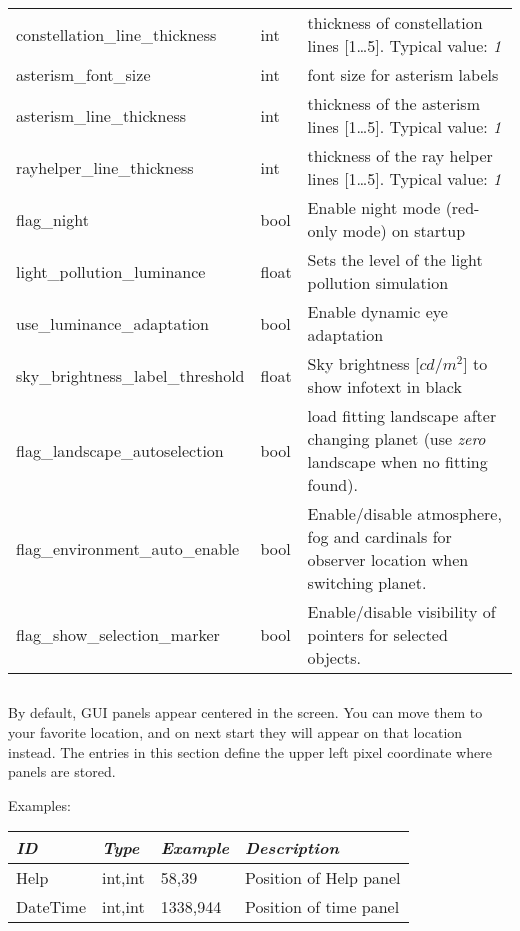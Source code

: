 \begin{longtable}{l|l|p{77mm}}
constellation\_line\_thickness     & int   & thickness of constellation lines [1\ldots5]. Typical value: \emph{1}\\%
asterism\_font\_size               & int   & font size for asterism labels\\%
asterism\_line\_thickness          & int   & thickness of the asterism lines [1\ldots5]. Typical value: \emph{1}\\%
rayhelper\_line\_thickness         & int   & thickness of the ray helper lines [1\ldots5]. Typical value: \emph{1}\\\midrule
flag\_night                        & bool  & Enable night mode (red-only mode) on startup\\\midrule
light\_pollution\_luminance        & float & Sets the level of the light pollution simulation\\\midrule %
use\_luminance\_adaptation         & bool  & Enable dynamic eye adaptation\\\midrule %
sky\_brightness\_label\_threshold  & float & Sky brightness [$cd/m^2$] to show infotext in black \\\midrule  %
flag\_landscape\_autoselection     & bool  & load fitting landscape after changing planet (use \emph{zero} landscape when no fitting found).\\
flag\_environment\_auto\_enable    & bool  & Enable/disable atmosphere, fog and cardinals for observer location when switching planet.\\
flag\_show\_selection\_marker      & bool  & Enable/disable visibility of pointers for selected objects.\\
\bottomrule
\end{longtable}



\subsection{}

By default, GUI panels appear centered in the screen. You can move them to your favorite location, 
and on next start they will appear on that location instead.
The entries in this section define the upper left pixel coordinate where panels are stored.

Examples:

\noindent%
\begin{tabularx}{\textwidth}{l|l|l|X}
\toprule
\emph{ID}     & \emph{Type} & \emph{Example}&\emph{Description}     \\\midrule
Help          & int,int     &  58,39        & Position of Help panel\\%
DateTime      & int,int     &  1338,944     & Position of time panel\\\bottomrule
\end{tabularx}

